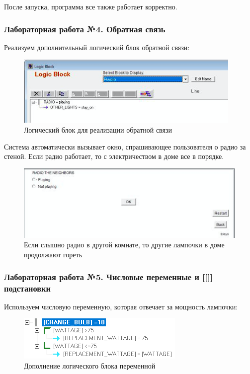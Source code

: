 \documentclass[14pt,a4paper,report]{report}
\begin{document}
После запуска, программа все также работает корректно.

\subsubsection{Лабораторная работа №4. Обратная связь}

Реализуем дополнительный логический блок обратной связи:

\begin{figure}[h!]
	\centering
	\includegraphics[scale = 1.2]{images/4_1.png}
	\caption{Логический блок для реализации обратной связи}
\end{figure}

Система автоматически вызывает окно, спрашивающее пользователя о радио за стеной. Если радио работает, то с электричеством в доме все в порядке.

\begin{figure}[h!]
	\centering
	\includegraphics[scale = 0.99]{images/4_2.png}
	\caption{Если слышно радио в другой комнате, то другие лампочки в доме продолжают гореть}
\end{figure}

\subsubsection{Лабораторная работа №5. Числовые переменные и [[]] подстановки}

Используем числовую переменную, которая отвечает за мощность лампочки:

\begin{figure}[h!]
	\centering
	\includegraphics[scale = 1.1]{images/5_1.png}
	\caption{Дополнение логического блока переменной}
\end{figure}
\end{document}
